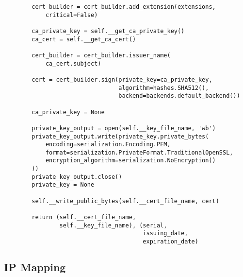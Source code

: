 \begin{verbatim}
        cert_builder = cert_builder.add_extension(extensions,
            critical=False)

        ca_private_key = self.__get_ca_private_key()
        ca_cert = self.__get_ca_cert()

        cert_builder = cert_builder.issuer_name(
            ca_cert.subject)

        cert = cert_builder.sign(private_key=ca_private_key,
                                 algorithm=hashes.SHA512(),
                                 backend=backends.default_backend())

        ca_private_key = None

        private_key_output = open(self.__key_file_name, 'wb')
        private_key_output.write(private_key.private_bytes(
            encoding=serialization.Encoding.PEM,
            format=serialization.PrivateFormat.TraditionalOpenSSL,
            encryption_algorithm=serialization.NoEncryption()
        ))
        private_key_output.close()
        private_key = None

        self.__write_public_bytes(self.__cert_file_name, cert)

        return (self.__cert_file_name,
                self.__key_file_name), (serial,
                                        issuing_date,
                                        expiration_date)
\end{verbatim}


\subsection{IP Mapping}

